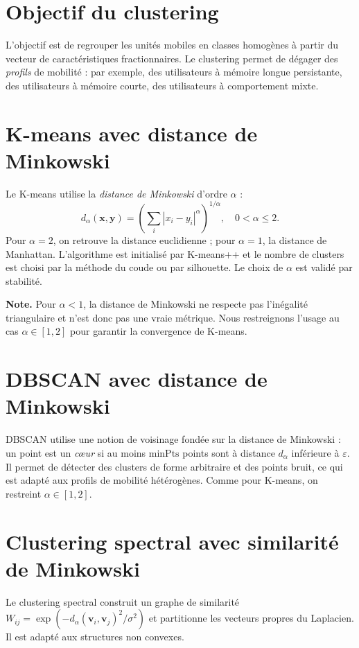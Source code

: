 \section{Objectif du clustering}
L'objectif est de regrouper les unités mobiles en classes homogènes à partir du vecteur de caractéristiques fractionnaires. Le clustering permet de dégager des \emph{profils} de mobilité : par exemple, des utilisateurs à mémoire longue persistante, des utilisateurs à mémoire courte, des utilisateurs à comportement mixte.

\section{K-means avec distance de Minkowski}
Le K-means utilise la \emph{distance de Minkowski} d'ordre $\alpha$ :
\begin{equation}
d_\alpha(\mathbf{x}, \mathbf{y}) = \left( \sum_i |x_i - y_i|^\alpha \right)^{1/\alpha}, \quad 0 < \alpha \le 2.
\end{equation}
Pour $\alpha = 2$, on retrouve la distance euclidienne ; pour $\alpha = 1$, la distance de Manhattan. L'algorithme est initialisé par K-means++ et le nombre de clusters est choisi par la méthode du coude ou par silhouette. Le choix de $\alpha$ est validé par stabilité.

\medskip
\textbf{Note.} Pour $\alpha < 1$, la distance de Minkowski ne respecte pas l'inégalité triangulaire et n'est donc pas une vraie métrique. Nous restreignons l'usage au cas $\alpha \in [1, 2]$ pour garantir la convergence de K-means.

\section{DBSCAN avec distance de Minkowski}
DBSCAN utilise une notion de voisinage fondée sur la distance de Minkowski : un point est un \emph{c\oe{}ur} si au moins $\text{minPts}$ points sont à distance $d_\alpha$ inférieure à $\varepsilon$. Il permet de détecter des clusters de forme arbitraire et des points bruit, ce qui est adapté aux profils de mobilité hétérogènes. Comme pour K-means, on restreint $\alpha \in [1, 2]$.

\section{Clustering spectral avec similarité de Minkowski}
Le clustering spectral construit un graphe de similarité $W_{ij} = \exp(-d_\alpha(\mathbf{v}_i, \mathbf{v}_j)^2 / \sigma^2)$ et partitionne les vecteurs propres du Laplacien. Il est adapté aux structures non convexes.

